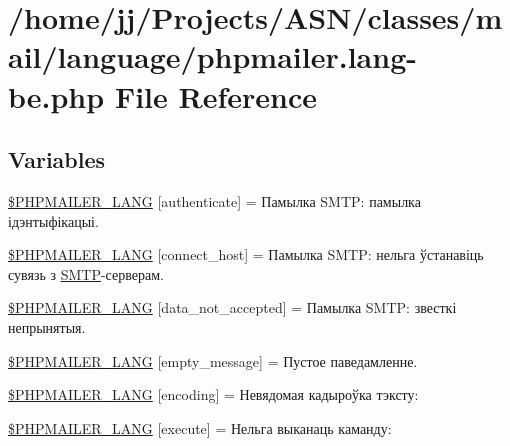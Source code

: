 \hypertarget{phpmailer_8lang-be_8php}{}\section{/home/jj/\+Projects/\+A\+S\+N/classes/mail/language/phpmailer.lang-\/be.php File Reference}
\label{phpmailer_8lang-be_8php}
\subsection*{Variables}
\begin{DoxyCompactItemize}
\item 
\hyperlink{phpmailer_8lang-be_8php_a2cb33073c989b85580748e331ed8b4aa}{\$\+P\+H\+P\+M\+A\+I\+L\+E\+R\+\_\+\+L\+A\+NG} \mbox{[}\textquotesingle{}authenticate\textquotesingle{}\mbox{]} = \textquotesingle{}Памылка S\+M\+T\+P\+: памылка ідэнтыфікацыі.\textquotesingle{}
\item 
\hyperlink{phpmailer_8lang-be_8php_a2ee0cc637a06b96e45600db31c6799ee}{\$\+P\+H\+P\+M\+A\+I\+L\+E\+R\+\_\+\+L\+A\+NG} \mbox{[}\textquotesingle{}connect\+\_\+host\textquotesingle{}\mbox{]} = \textquotesingle{}Памылка S\+M\+T\+P\+: нельга ўстанавіць сувязь з \hyperlink{class_s_m_t_p}{S\+M\+TP}-\/серверам.\textquotesingle{}
\item 
\hyperlink{phpmailer_8lang-be_8php_a814c6b191205d2361b3233e9c9d6fda5}{\$\+P\+H\+P\+M\+A\+I\+L\+E\+R\+\_\+\+L\+A\+NG} \mbox{[}\textquotesingle{}data\+\_\+not\+\_\+accepted\textquotesingle{}\mbox{]} = \textquotesingle{}Памылка S\+M\+T\+P\+: звесткі непрынятыя.\textquotesingle{}
\item 
\hyperlink{phpmailer_8lang-be_8php_a33772099f637c9d6c2cd7425e0e37fed}{\$\+P\+H\+P\+M\+A\+I\+L\+E\+R\+\_\+\+L\+A\+NG} \mbox{[}\textquotesingle{}empty\+\_\+message\textquotesingle{}\mbox{]} = \textquotesingle{}Пустое паведамленне.\textquotesingle{}
\item 
\hyperlink{phpmailer_8lang-be_8php_a817f7283f3d54c970a0c10305cc668cc}{\$\+P\+H\+P\+M\+A\+I\+L\+E\+R\+\_\+\+L\+A\+NG} \mbox{[}\textquotesingle{}encoding\textquotesingle{}\mbox{]} = \textquotesingle{}Невядомая кадыроўка тэксту\+: \textquotesingle{}
\item 
\hyperlink{phpmailer_8lang-be_8php_a668217a9563a168f30f2a8548b6ed5a9}{\$\+P\+H\+P\+M\+A\+I\+L\+E\+R\+\_\+\+L\+A\+NG} \mbox{[}\textquotesingle{}execute\textquotesingle{}\mbox{]} = \textquotesingle{}Нельга выканаць каманду\+: \textquotesingle{}

\end{DoxyCompactItemize}
